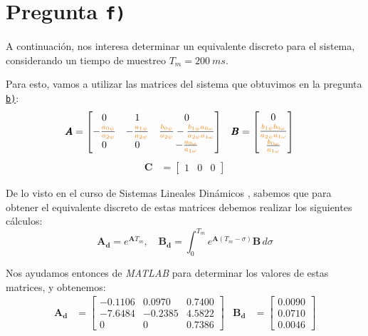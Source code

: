 \section{Pregunta \texttt{f)}}\label{pregunta-f}

A continuación, nos interesa determinar un equivalente discreto para el
sistema, considerando un tiempo de muestreo $T_{m} = 200\ \unit{ms}$.

Para esto, vamos a utilizar las matrices del sistema que obtuvimos en la pregunta
\hyperref[pregunta-b]{\texttt{b)}}:
\begin{align}
    \pmb{A} &= \begin{bmatrix}
        0 & 1 & 0 \\
        -\frac{\nara{a_{0\psi}}}{\nara{a_{2\psi}}}   & -\frac{\nara{a_{1\psi}}}{\nara{a_{2\psi}}} & \frac{\nara{b_{0\psi}}}{\nara{a_{2\psi}}} - \frac{\nara{b_{1\psi}}\nara{a_{0\omega}}}{\nara{a_{2\psi}}\nara{a_{1\omega}}} \\
        0 & 0 & -\frac{\nara{a_{0\omega}}}{\nara{a_{1\omega}}}
    \end{bmatrix} &
    \pmb{B} &= \begin{bmatrix}
        0 \\
        \frac{\nara{b_{1\psi}}\nara{b_{0\omega}}}{\nara{a_{2\psi}}\nara{a_{1\omega}}} \\
        \frac{\nara{b_{0\omega}}}{\nara{a_{1\omega}}}
    \end{bmatrix}
\end{align}
\begin{align}
  \pmb{C} &= \begin{bmatrix}
    1 & 0 & 0
  \end{bmatrix}
\end{align}

De lo visto en el curso de Sistemas Lineales Dinámicos \cite{apunte-sld}, sabemos
que para obtener el equivalente discreto de estas matrices debemos realizar los
siguientes cálculos:
\begin{equation}
    \mathbf{A_d}= e^{\mathbf{A}T_{m}} ,\quad \mathbf{B_d}= \int_{0}^{T_{m}} e^{\mathbf{A}(T_{m}-\sigma)}\mathbf{B}  \,d\sigma 
\end{equation}

Nos ayudamos entonces de \textit{MATLAB} para determinar los valores de estas
matrices, y obtenemos:
\begin{align}
    \mathbf{A_d} &= \begin{bmatrix}
        -0.1106 & 0.0970 & 0.7400 \\
        -7.6484 &  -0.2385 & 4.5822 \\
        0 & 0 & 0.7386
    \end{bmatrix} &
    \mathbf{B_d} &= \begin{bmatrix}
        0.0090 \\
        0.0710 \\
        0.0046
    \end{bmatrix}
\end{align}

